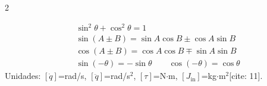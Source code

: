\documentclass[10pt, a4paper]{article}
\begin{document}
\begin{multicols*}{2}
\begin{tcolorbox}[sectionbox, title=Identidades y Unidades{[cite: 11]}]
\begin{align*}
    &\sin^2\theta + \cos^2\theta = 1 \\
    &\sin(A \pm B) = \sin A\cos B \pm \cos A\sin B \\
    &\cos(A \pm B) = \cos A\cos B \mp \sin A\sin B \\
    &\sin(-\theta) = -\sin\theta \qquad \cos(-\theta) = \cos\theta
\end{align*}
Unidades: $[\dot{q}]$=rad/s, $[\ddot{q}]$=rad/s$^2$, $[\tau]$=N$\cdot$m, $[J_{\text{in}}]$=kg$\cdot$m$^2$[cite: 11].
\end{tcolorbox}

\end{multicols*}
\end{document}
